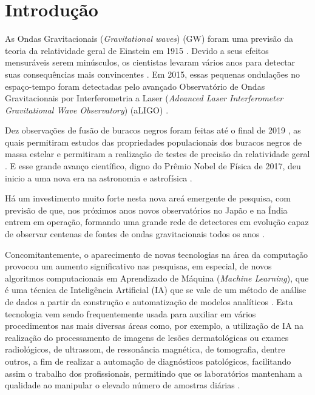 \chapter{Introdução}

As Ondas Gravitacionais (\textit{Gravitational waves}) (GW) foram uma previsão da teoria da relatividade geral de Einstein em 1915 \cite{albert1920realtivity}. Devido a seus efeitos mensuráveis serem minúsculos, os cientistas levaram vários anos para detectar suas consequências mais convincentes \cite{cervantes2016brief}. Em 2015, essas pequenas ondulações no espaço-tempo foram detectadas pelo avançado Observatório de Ondas Gravitacionais por Interferometria a Laser (\textit{Advanced Laser Interferometer Gravitational Wave Observatory}) (aLIGO) \cite{PhysRevLett.116.131103, 0264-9381-32-7-074001}.

Dez observações de fusão de buracos negros foram feitas até o final de 2019 \cite{Abbott_2019}, as quais permitiram estudos das propriedades populacionais dos buracos negros de massa estelar e permitiram a realização de testes de precisão da relatividade geral \cite{collaboration2018binary}. E esse grande avanço científico, digno do Prêmio Nobel de Física de 2017, deu inicio a uma nova era na astronomia e astrofísica \cite{huerta2017boss}.

Há um investimento muito forte nesta nova areá emergente de pesquisa, com previsão de que, nos próximos anos novos observatórios no Japão e na Índia entrem em operação, formando uma grande rede de detectores em evolução capaz de observar centenas de fontes de ondas gravitacionais todos os anos \cite{PhysRevD.100.063015}.

Concomitantemente, o aparecimento de novas tecnologias na área da computação provocou um aumento significativo nas pesquisas, em especial, de novos algoritmos computacionais em Aprendizado de Máquina (\textit{Machine Learning}), que é uma técnica de Inteligência Artificial (IA) que se vale de um método de análise de dados a partir da construção e automatização de modelos analíticos \cite{bisong2019building}. Esta tecnologia vem sendo frequentemente usada para auxiliar em vários procedimentos nas mais diversas áreas como, por exemplo, a utilização de IA na realização do processamento de imagens de lesões dermatológicas ou exames radiológicos, de ultrassom, de ressonância magnética, de tomografia, dentre outros, a fim de realizar a automação de diagnósticos patológicos, facilitando assim o trabalho dos profissionais, permitindo que os laboratórios mantenham a qualidade ao manipular o elevado número de amostras diárias \cite{lobo2017inteligencia}.


